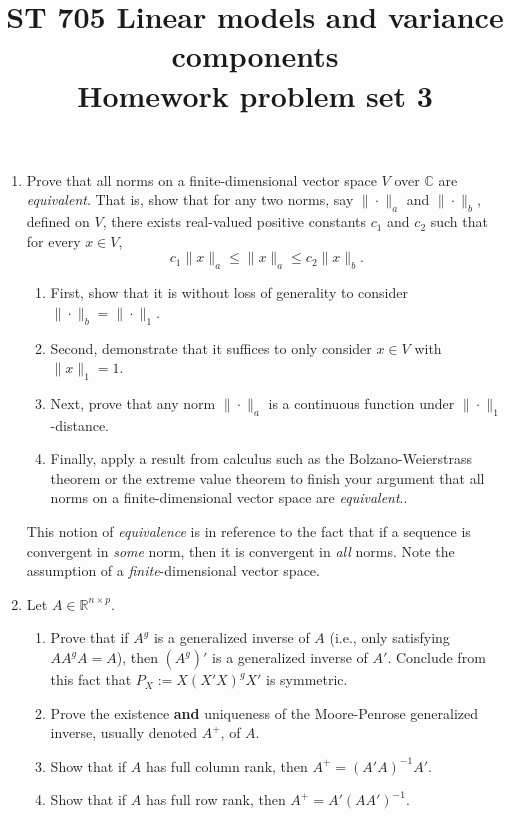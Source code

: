 \documentclass[11pt]{article}
\title{ST 705 Linear models and variance components \\ 
        Homework problem set 3}
\begin{document}
\maketitle

\begin{enumerate}

\item Prove that all norms on a finite-dimensional vector space $V$ over $\mathbb{C}$ are {\em equivalent}.  That is, show that for any two norms, say $\|\cdot\|_{a}$ and $\|\cdot\|_{b}$, defined on $V$, there exists real-valued positive constants $c_{1}$ and $c_{2}$ such that for every $x \in V$,
\[
c_{1}\|x\|_{a} \le \|x\|_{a} \le c_{2}\|x\|_{b}.
\]
\begin{enumerate}
\item First, show that it is without loss of generality to consider $\|\cdot\|_{b} = \|\cdot\|_{1}$.
\item Second, demonstrate that it suffices to only consider $x \in V$ with $\|x\|_{1} = 1$.
\item Next, prove that any norm $\|\cdot\|_{a}$ is a continuous function under $\|\cdot\|_{1}$-distance.
\item Finally, apply a result from calculus such as the Bolzano-Weierstrass theorem or the extreme value theorem to finish your argument that all norms on a finite-dimensional vector space are {\em equivalent}..
\end{enumerate}
This notion of {\em equivalence} is in reference to the fact that if a sequence is convergent in {\em some} norm, then it is convergent in {\em all} norms.  Note the assumption of a {\em finite}-dimensional vector space.

\item Let $A \in \mathbb{R}^{n\times p}$.
\begin{enumerate}
\item Prove that if $A^{g}$ is a generalized inverse of $A$ (i.e., only satisfying $AA^{g}A = A$), then $(A^{g})'$ is a generalized inverse of $A'$.  Conclude from this fact that $P_{X} := X(X'X)^{g}X'$ is symmetric.
\item Prove the existence \textbf{and} uniqueness of the Moore-Penrose generalized inverse, usually denoted $A^{+}$, of $A$.
\item Show that if $A$ has full column rank, then $A^{+} = (A'A)^{-1}A'$.  
\item Show that if $A$ has full row rank, then $A^{+} = A'(AA')^{-1}$.
\end{enumerate}


\end{enumerate}
\end{document}
